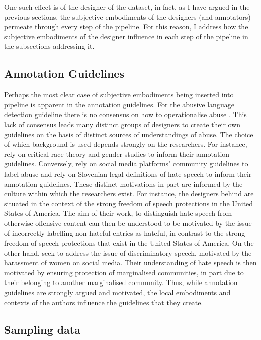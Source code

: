 One such effect is of the designer of the dataset, in fact, as I have argued in the previous sections, the subjective embodiments of the designers (and annotators) permeate through every step of the pipeline. For this reason, I address how the subjective embodiments of the designer influence in each step of the pipeline in the subsections addressing it.

\subsection{Annotation Guidelines}

Perhaps the most clear case of subjective embodiments being inserted into pipeline is apparent in the annotation guidelines. For the abusive language detection guideline there is no consensus on how to operationalise abuse \citep{Waseem:2017}. This lack of consensus leads many distinct groups of designers to create their own guidelines on the basis of distinct sources of understandings of abuse. The choice of which background is used depends strongly on the researchers. For instance, \citet{Waseem-Hovy:2016} rely on critical race theory and gender studies to inform their annotation guidelines. Conversely, \citet{Davidson:2017} rely on social media platforms' community guidelines to label abuse and \citet{Fiser:2017} rely on Slovenian legal definitions of hate speech to inform their annotation guidelines. These distinct motivations in part are informed by the culture within which the researchers exist. For instance, the designers behind \citet{Davidson:2017} are situated in the context of the strong freedom of speech protections in the United States of America. The aim of their work, to distinguish hate speech from otherwise offensive content can then be understood to be motivated by the issue of incorrectly labelling non-hateful entries as hateful, in contrast to the strong freedom of speech protections that exist in the United States of America. On the other hand, \citet{Waseem-Hovy:2016} seek to address the issue of discriminatory speech, motivated by the harassment of women on social media. Their understanding of hate speech is then motivated by ensuring protection of marginalised communities, in part due to their belonging to another marginalised community.
Thus, while annotation guidelines are strongly argued and motivated, the local embodiments and contexts of the authors influence the guidelines that they create.


\subsection{Sampling data}


